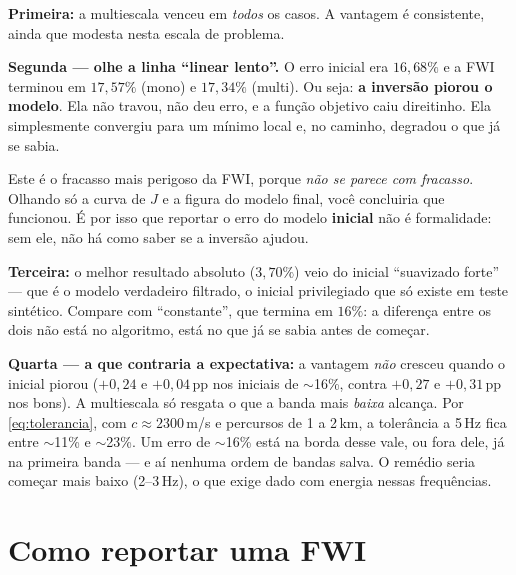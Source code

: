 \documentclass[11pt,a4paper,oneside]{report}
\begin{document}
\begin{teoria}
\textbf{Primeira:} a multiescala venceu em \emph{todos} os casos. A vantagem é
consistente, ainda que modesta nesta escala de problema.

\textbf{Segunda --- olhe a linha ``linear lento''.} O erro inicial era
$16{,}68\%$ e a FWI terminou em $17{,}57\%$ (mono) e $17{,}34\%$ (multi). Ou
seja: \textbf{a inversão piorou o modelo}. Ela não travou, não deu erro, e a
função objetivo caiu direitinho. Ela simplesmente convergiu para um mínimo
local e, no caminho, degradou o que já se sabia.

Este é o fracasso mais perigoso da FWI, porque \emph{não se parece com
fracasso}. Olhando só a curva de $J$ e a figura do modelo final, você
concluiria que funcionou. É por isso que reportar o erro do modelo
\textbf{inicial} não é formalidade: sem ele, não há como saber se a inversão
ajudou.

\textbf{Terceira:} o melhor resultado absoluto ($3{,}70\%$) veio do inicial
``suavizado forte'' --- que é o modelo verdadeiro filtrado, o inicial
privilegiado que só existe em teste sintético. Compare com ``constante'', que
termina em $16\%$: a diferença entre os dois não está no algoritmo, está no
que já se sabia antes de começar.

\textbf{Quarta --- a que contraria a expectativa:} a vantagem \emph{não}
cresceu quando o inicial piorou ($+0{,}24$ e $+0{,}04$\,pp nos iniciais de
$\sim$16\%, contra $+0{,}27$ e $+0{,}31$\,pp nos bons). A multiescala só
resgata o que a banda mais \emph{baixa} alcança. Por \eqref{eq:tolerancia},
com $c \approx 2300$\,m/s e percursos de 1 a 2\,km, a tolerância a 5\,Hz fica
entre $\sim$11\% e $\sim$23\%. Um erro de $\sim$16\% está na borda desse vale,
ou fora dele, já na primeira banda --- e aí nenhuma ordem de bandas salva. O
remédio seria começar mais baixo (2--3\,Hz), o que exige dado com energia
nessas frequências.
\end{teoria}

\section{Como reportar uma FWI}
\end{document}
